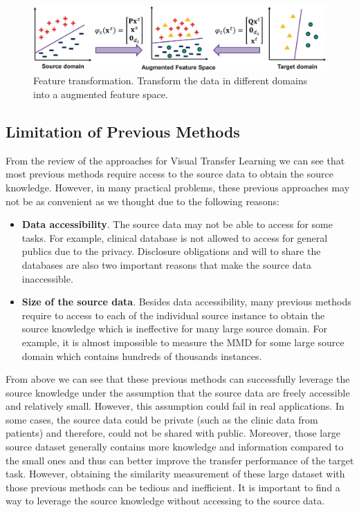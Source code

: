 \begin{figure}
	\centering
	\includegraphics[scale=.3]{introduction/fig/transformation.png}
	\caption{Feature transformation. Transform the data in different domains into a augmented feature space.}\label{fig:intro:trans}
\end{figure}

\subsection{Limitation of Previous Methods}
From the review of the approaches for Visual Transfer Learning we can see that
most previous methods require access to the source data to obtain the source knowledge. However, in many practical problems, these previous approaches may not be as convenient as we thought due to the following reasons:

\begin{itemize}
	\item \textbf{Data accessibility}. The source data may not be able to access for some tasks. For example, clinical database is not allowed to access for general publics due to the privacy. Disclosure obligations and will to share the databases are also two important reasons that make the source data inaccessible.
	\item \textbf{Size of the source data}. Besides data accessibility, many previous methods \cite{daume2009frustratingly}\cite{duan2012learning} require to access to each of the individual source instance to obtain the source knowledge which is ineffective for many large source domain. For example, it is almost impossible to measure the MMD for some large source domain which contains hundreds of thousands instances.
\end{itemize}

From above we can see that these previous methods can successfully leverage the source knowledge under the assumption that the source data are freely accessible and relatively small. However, this assumption could fail in real applications. In some cases, the source data could be private (such as the clinic data from patients) and therefore, could not be shared with public. Moreover, those large source dataset generally contains more knowledge and information compared to the small ones and thus can better improve the transfer performance of the target task. However, obtaining the similarity measurement of these large dataset with those previous methods can be tedious and inefficient. It is important to find a way to leverage the source knowledge without accessing to the source data.

